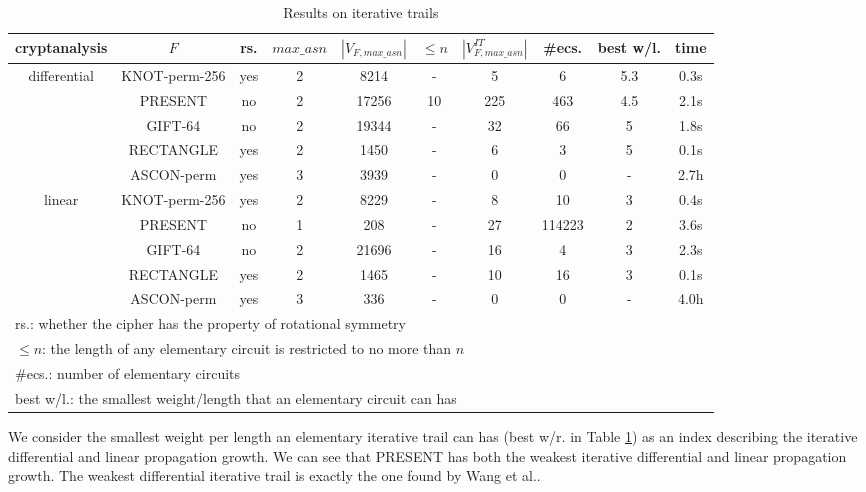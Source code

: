 \begin{table}
	\caption{Results on iterative trails}\label{tab:iterative-trails}
	\centering
	\tiny
	\begin{tabular}{|c|c|c|c|c|c|c|c|c|c|}
		\hline
		cryptanalysis & $F$ & rs. & $max\_asn$ &$|V_{F,max\_asn}|$&$\leq n$& $|V^{IT}_{F,max\_asn}|$ & \#ecs. & best w/l. &time\\
		\hline
		\multirow{5}{*}{differential}
		&KNOT-perm-256 & yes & 2 & 8214 & - & 5 & 6 & 5.3 & 0.3s\\
		\cline{2-10}
		&PRESENT & no & 2 & 17256 & 10 & 225 & 463 & 4.5 & 2.1s\\
		\cline{2-10}
		&GIFT-64 & no & 2 & 19344 & - & 32 & 66 & 5 & 1.8s\\
		\cline{2-10}
		& RECTANGLE & yes & 2 & 1450 & - & 6 & 3 & 5 & 0.1s\\
		\cline{2-10}
		& ASCON-perm & yes & 3 & 3939 & - & 0 & 0 & - & 2.7h\\
		\hline
		\multirow{4}{*}{linear}
		& KNOT-perm-256 & yes & 2 & 8229 & - & 8 & 10 & 3 & 0.4s\\
		\cline{2-10}
		& PRESENT & no & 1 & 208 & - & 27 & 114223 & 2 & 3.6s\\
		\cline{2-10}
		& GIFT-64 & no & 2 & 21696 & - & 16 & 4 & 3 & 2.3s\\
		\cline{2-10}
		& RECTANGLE & yes & 2 & 1465 & - & 10 & 16 & 3 & 0.1s\\
		\cline{2-10}
		& ASCON-perm & yes & 3 & 336 & - & 0 & 0 & - & 4.0h\\
		\hline
		\multicolumn{9}{l}{rs.: whether the cipher has the property of rotational symmetry}\\
		\multicolumn{9}{l}{$\leq n$: the length of any elementary circuit is restricted to no more than $n$}\\
		\multicolumn{9}{l}{\#ecs.: number of elementary circuits}\\
		\multicolumn{9}{l}{best w/l.: the smallest weight/length that an elementary circuit can has}\\
	\end{tabular}
\end{table}

We consider the smallest weight per length an elementary iterative trail can has (best w/r. in Table \ref{tab:iterative-trails}) as an index describing the iterative differential and linear propagation growth. We can see that PRESENT has both the weakest iterative differential and linear propagation growth. The weakest differential iterative trail is exactly the one found by Wang et al.\cite{W08}. 

